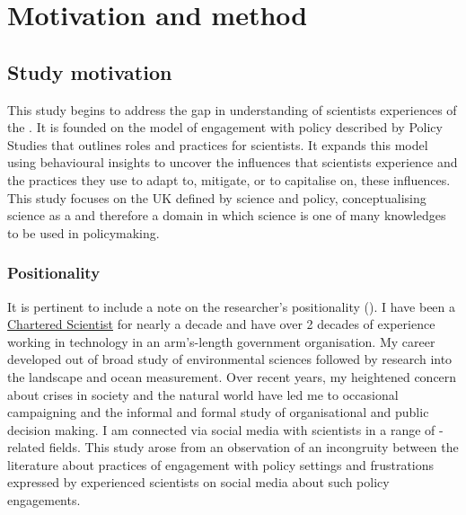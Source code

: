\chapter{Motivation and method}\label{ch:methods}

\section{Study motivation}\label{sec:metmotivation}

This study begins to address the gap in understanding of scientists experiences of the \SPI. It is founded on the model of engagement with policy described by Policy Studies that outlines roles and practices for scientists. It expands this model using behavioural insights to uncover the influences that scientists experience and the practices they use to adapt to, mitigate, or to capitalise on, these influences. This study focuses on the UK \SPI{} defined by \CAN{} science and policy, conceptualising \CAN{} science as a \PNS{} and therefore a domain in which science is one of many knowledges to be used in policymaking. 

\subsection{Positionality}\label{sec:metpositionality}

It is pertinent  to include a note on the researcher's positionality (\cite{CreswellP2017}). I have been a \href{https://sciencecouncil.org/scientists-science-technicians/which-professional-award-is-right-for-me/csci/}{Chartered Scientist} for nearly a decade and have over 2 decades of experience working in technology in an arm's-length government organisation. My career developed out of broad study of environmental sciences followed by research into the landscape and ocean measurement. Over recent years, my heightened concern about crises in society and the natural world have led me to occasional campaigning and the informal and formal study of organisational and public decision making. I am connected via social media with scientists in a range of \CAN-related fields. This study arose from an observation of an incongruity between the literature about practices of engagement with policy settings and frustrations expressed by experienced scientists on social media about such policy engagements.


